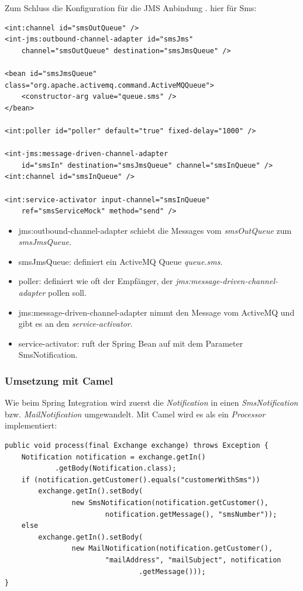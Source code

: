 \documentclass[12pt,a4paper,ngerman]{article}
\begin{document}
Zum Schluss die Konfiguration für die JMS Anbindung . hier für Sms:

\begin{lstlisting}
<int:channel id="smsOutQueue" />
<int-jms:outbound-channel-adapter id="smsJms"
    channel="smsOutQueue" destination="smsJmsQueue" />

<bean id="smsJmsQueue" class="org.apache.activemq.command.ActiveMQQueue">
    <constructor-arg value="queue.sms" />
</bean>

<int:poller id="poller" default="true" fixed-delay="1000" />

<int-jms:message-driven-channel-adapter
    id="smsIn" destination="smsJmsQueue" channel="smsInQueue" />
<int:channel id="smsInQueue" />

<int:service-activator input-channel="smsInQueue"
    ref="smsServiceMock" method="send" />
\end{lstlisting}

\begin{itemize}
\item
  jms:outbound-channel-adapter schiebt die Messages vom
  \emph{smsOutQueue} zum \emph{smsJmsQueue}.
\item
  smsJmsQueue: definiert ein ActiveMQ Queue \emph{queue.sms}.
\item
  poller: definiert wie oft der Empfänger, der
  \emph{jms:message-driven-channel-adapter} pollen soll.
\item
  jms:message-driven-channel-adapter nimmt den Message vom ActiveMQ und
  gibt es an den \emph{service-activator}.
\item
  service-activator: ruft der Spring Bean auf mit dem Parameter
  SmsNotification.
\end{itemize}

\subsubsection{Umsetzung mit Camel}

Wie beim Spring Integration wird zuerst die \emph{Notification} in einen
\emph{SmsNotification} bzw. \emph{MailNotification} umgewandelt. Mit
Camel wird es als ein \emph{Processor} implementiert:

\begin{lstlisting}
public void process(final Exchange exchange) throws Exception {
    Notification notification = exchange.getIn()
            .getBody(Notification.class);
    if (notification.getCustomer().equals("customerWithSms"))
        exchange.getIn().setBody(
                new SmsNotification(notification.getCustomer(),
                        notification.getMessage(), "smsNumber"));
    else
        exchange.getIn().setBody(
                new MailNotification(notification.getCustomer(),
                        "mailAddress", "mailSubject", notification
                                .getMessage()));
}
\end{lstlisting}
\end{document}
